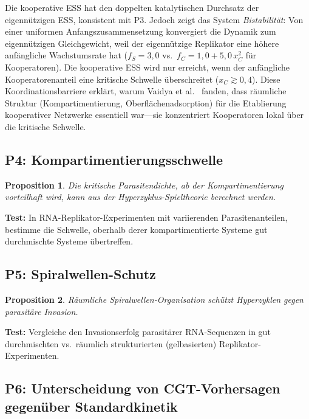 \documentclass[12pt,a4paper]{article}
\newtheorem{proposition}{Proposition}
\theoremstyle{remark}
\begin{document}
Die kooperative ESS hat den doppelten katalytischen Durchsatz der eigenn\"utzigen ESS, konsistent mit P3. Jedoch zeigt das System \emph{Bistabilit\"at}: Von einer uniformen Anfangszusammensetzung konvergiert die Dynamik zum eigenn\"utzigen Gleichgewicht, weil der eigenn\"utzige Replikator eine h\"ohere anf\"angliche Wachstumsrate hat ($f_S = 3{,}0$ vs.\ $f_C = 1{,}0 + 5{,}0 \, x_C^2$ f\"ur Kooperatoren). Die kooperative ESS wird nur erreicht, wenn der anf\"angliche Kooperatorenanteil eine kritische Schwelle \"uberschreitet ($x_C \gtrsim 0{,}4$). Diese Koordinationsbarriere erkl\"art, warum Vaidya et al.\ \citep{AzoarcusPNAS} fanden, dass r\"aumliche Struktur (Kompartimentierung, Oberfl\"achenadsorption) f\"ur die Etablierung kooperativer Netzwerke essentiell war---sie konzentriert Kooperatoren lokal \"uber die kritische Schwelle.

\subsection{P4: Kompartimentierungsschwelle}

\begin{proposition}
Die kritische Parasitendichte, ab der Kompartimentierung vorteilhaft wird, kann aus der Hyperzyklus-Spieltheorie berechnet werden.
\end{proposition}

\textbf{Test:} In RNA-Replikator-Experimenten mit variierenden Parasitenanteilen, bestimme die Schwelle, oberhalb derer kompartimentierte Systeme gut durchmischte Systeme \"ubertreffen.

\subsection{P5: Spiralwellen-Schutz}

\begin{proposition}
R\"aumliche Spiralwellen-Organisation sch\"utzt Hyperzyklen gegen parasit\"are Invasion.
\end{proposition}

\textbf{Test:} Vergleiche den Invasionserfolg parasit\"arer RNA-Sequenzen in gut durchmischten vs.\ r\"aumlich strukturierten (gelbasierten) Replikator-Experimenten.

\subsection{P6: Unterscheidung von CGT-Vorhersagen gegen\"uber Standardkinetik}
\end{document}
